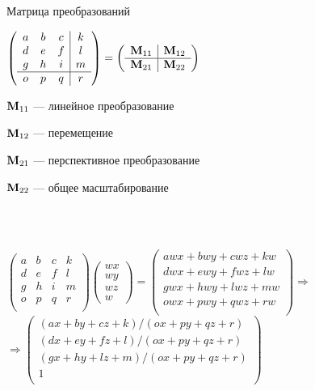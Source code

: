 \documentclass[10pt]{beamer}
\begin{document}
	\begin{frame}{Матрица преобразований}
		
		{
			$   \left(
			\begin{array}{ccc|c}
				a & b & c & k \\
				d & e & f & l \\
				g & h & i & m \\ \hline
				o & p & q & r \\				
			\end{array}
			\right) = 
			\left(
			\begin{array}{c|c}
				\textbf M_{11} & \textbf M_{12} \\ \hline
                \textbf M_{21} & \textbf M_{22}						
			\end{array}
			\right)
			$
		}
		{
			$\textbf M_{11}$  --- линейное преобразование \footnotemark 
				
			$\textbf M_{12}$ --- перемещение 
			
			$\textbf M_{21}$ --- перспективное преобразование
			
			$\textbf M_{22}$ --- общее масштабирование
		} 
		
		
		\hfil \\ ~ \\
       
		\pause
		
		$
		\left(
		\begin{array}{cccc}
			a & b & c & k \\
			d & e & f & l \\
			g & h & i & m \\ 
			o & p & q & r \\				
		\end{array}
		\right)
		\begin{pmatrix}
			wx\\wy\\wz\\w
		\end{pmatrix}
		=
		\begin{pmatrix}
			awx+bwy+cwz+kw\\
			dwx+ewy+fwz+lw\\
			gwx+hwy+lwz+mw\\
			owx+pwy+qwz+rw\\
		\end{pmatrix}
	   \Rightarrow
		$\\
		$
		\Rightarrow
		\begin{pmatrix}
			(ax+by+cz+k)/(ox+py+qz+r)\\
			(dx+ey+fz+l)/(ox+py+qz+r)\\
			(gx+hy+lz+m)/(ox+py+qz+r)\\
			1\\
		\end{pmatrix}
		$
		
		 
	\end{frame}
	
\end{document}
